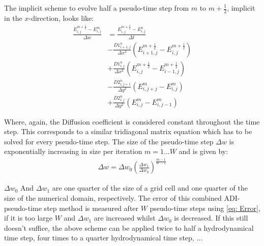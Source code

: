 The implicit scheme to evolve half a pseudo-time step from $m$ to $m + \frac{1}{2}$, implicit in the $x$-direction, looks like:
\begin{align}
\frac{E_{i,j}^{m+\frac{1}{2}} - E_{i,j}^{m}}{\Delta w} 
 &= \frac{E_{i,j}^{m+\frac{1}{2}} - E_{i,j}^{n}}{\Delta t} \\
 &- \frac{D1_{i+1,j}^{n}}{\Delta x^2} (E_{i+1,j}^{m+\frac{1}{2}} - E_{i,j}^{m+\frac{1}{2}}) \\
 &+ \frac{D1_{i,j}^{n}}{\Delta x^2} (E_{i,j}^{m+\frac{1}{2}} - E_{i-1,j}^{m+\frac{1}{2}}) \\
 &- \frac{D2_{i,j+1}^{n}}{\Delta y^2} (E_{i,j+j}^{m} - E_{i,j}^{m}) \\
 &+ \frac{D2_{i,j}^{n}}{\Delta y^2} (E_{i,j}^{m} - E_{i,j-1}^{m})
\end{align}

Where, again, the Diffusion coefficient is considered constant throughout the time step. This corresponds to a similar tridiagonal matrix equation which has to be solved for every pseudo-time step. The size of the pseudo-time step $\Delta w$ is exponentially increasing in size per iteration $m = 1 ... W$ and is given by:
\begin{align}
\Delta w = \Delta w_0 \left(\frac{\Delta w_1}{\Delta w_0} \right)^\frac{m-1}{W-1}
\end{align}

$\Delta w_0$ And $\Delta w_1$ are one quarter of the size of a grid cell and one quarter of the size of the numerical domain, respectively. The error of this combined ADI-pseudo-time step method is measured after $W$ pseudo-time steps using \eqref{eq: Error}, if it is too large $W$ and $\Delta w_1$ are increased whilst $\Delta w_0$ is decreased. If this still doesn't suffice, the above scheme can be applied twice to half a hydrodynamical time step, four times to a quarter hydrodynamical time step, ... 

